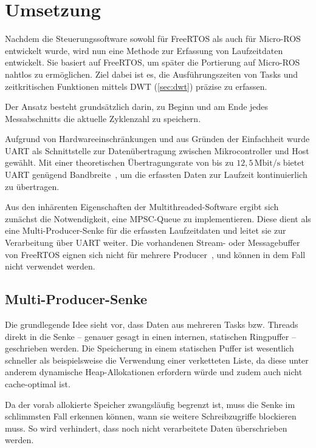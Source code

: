 \section{Umsetzung}

Nachdem die Steuerungssoftware sowohl für FreeRTOS als auch für Micro-ROS
entwickelt wurde, wird nun eine Methode zur Erfassung von Laufzeitdaten
entwickelt. Sie basiert auf FreeRTOS, um später die Portierung auf Micro-ROS
nahtlos zu ermöglichen. Ziel dabei ist es, die Ausführungszeiten von Tasks und
zeitkritischen Funktionen mittels DWT (\ref{sec:dwt}) präzise zu erfassen.

Der Ansatz besteht grundsätzlich darin, zu Beginn und am Ende jedes
Messabschnitts die aktuelle Zyklenzahl zu speichern.

Aufgrund von Hardwareeinschränkungen und aus Gründen der Einfachheit wurde UART
als Schnittstelle zur Datenübertragung zwischen Mikrocontroller und Host
gewählt. Mit einer theoretischen Übertragungsrate von bis zu
$12,5\,\text{Mbit/s}$ bietet UART genügend Bandbreite~\cite[S.
2]{stm32_datasheet}, um die erfassten Daten zur Laufzeit kontinuierlich zu
übertragen.

Aus den inhärenten Eigenschaften der Multithreaded-Software ergibt sich zunächst
die Notwendigkeit, eine \ac{MPSC}-Queue zu implementieren. Diese dient als eine
Multi-Producer-Senke für die erfassten Laufzeitdaten und leitet sie zur
Verarbeitung über UART weiter. Die vorhandenen Stream- oder Messagebuffer von
FreeRTOS eignen sich nicht für mehrere Producer~\cite{FreeRTOSStreamBuffer}, und
können in dem Fall nicht verwendet werden.

\subsection{Multi-Producer-Senke}

Die grundlegende Idee sieht vor, dass Daten aus mehreren Tasks bzw. Threads
direkt in die Senke -- genauer gesagt in einen internen, statischen Ringpuffer
-- geschrieben werden. Die Speicherung in einem statischen Puffer ist wesentlich
schneller als beispielsweise die Verwendung einer verketteten Liste, da diese
unter anderem dynamische Heap-Allokationen erfordern würde und zudem auch nicht
cache-optimal ist.

Da der vorab allokierte Speicher zwangsläufig begrenzt ist, muss die Senke im
schlimmsten Fall erkennen können, wann sie weitere Schreibzugriffe blockieren
muss. So wird verhindert, dass noch nicht verarbeitete Daten überschrieben
werden.

